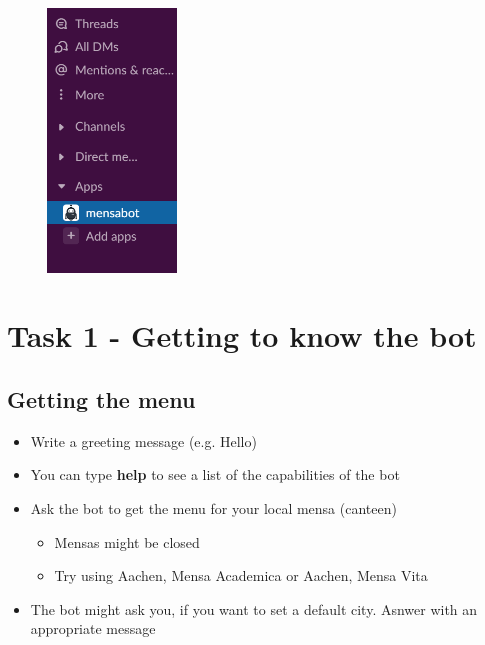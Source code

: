 \begin{figure}[h]
    \centering
    \includegraphics[height=7cm]{bot.png}
\end{figure}


      
\section*{Task 1 - Getting to know the bot}
\subsection*{Getting the menu}
\begin{itemize}
    \item Write a greeting message (e.g. Hello)
    \item You can type \textbf{help} to see a list of the capabilities of the bot
    \item Ask the bot to get the menu for your local mensa (canteen)
    \begin{itemize}
      \item Mensas might be closed
      \item Try using Aachen, Mensa Academica or Aachen, Mensa Vita
    \end{itemize}
    \item The bot might ask you, if you want to set a default city. Asnwer with an appropriate message
\end{itemize}
